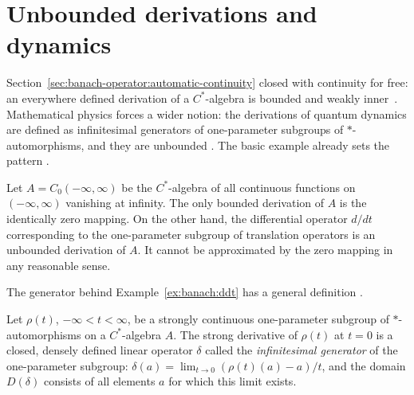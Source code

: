 \section{Unbounded derivations and dynamics}\label{sec:banach-operator:unbounded}

Section~\ref{sec:banach-operator:automatic-continuity} closed with
continuity for free: an everywhere defined derivation of a $C^*$-algebra
is bounded and weakly inner~\cite[pp.~427--428]{Sakai1976OneParameter}. Mathematical physics forces a wider notion:
the derivations of quantum dynamics are defined as infinitesimal
generators of one-parameter subgroups of $*$-automorphisms, and they are
unbounded \cite[p.~427]{Sakai1976OneParameter}. The basic example already
sets the pattern \cite[pp.~427--428]{Sakai1976OneParameter}.

\begin{example}\label{ex:banach:ddt}
Let $A=C_0(-\infty,\infty)$ be the $C^*$-algebra of all continuous
functions on $(-\infty,\infty)$ vanishing at infinity. The only bounded
derivation of $A$ is the identically zero mapping. On the other hand, the
differential operator $d/dt$ corresponding to the one-parameter subgroup
of translation operators is an unbounded derivation of $A$. It cannot be
approximated by the zero mapping in any reasonable sense.
\end{example}

The generator behind Example~\ref{ex:banach:ddt} has a general
definition \cite[p.~428]{Sakai1976OneParameter}.

\begin{definition}\label{def:banach:generator}
Let $\rho(t)$, $-\infty<t<\infty$, be a strongly continuous one-parameter
subgroup of $*$-automorphisms on a $C^*$-algebra $A$. The strong
derivative of $\rho(t)$ at $t=0$ is a closed, densely defined linear
operator $\delta$ called the \emph{infinitesimal generator} of the
one-parameter subgroup:
$\delta(a)=\lim_{t\to 0}(\rho(t)(a)-a)/t$, and the domain $D(\delta)$
consists of all elements $a$ for which this limit exists.
\end{definition}

